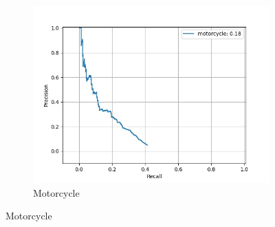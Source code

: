 \begin{figure}[ht]
\begin{subfigure}[t]{0.325\textwidth}
    		\centering
    		\includegraphics[width=\textwidth]{images/sub_ens_pr/class_motorcycle_pr.jpg}
    		\caption{Motorcycle}
    	\end{subfigure}
    	
    
   

\end{figure}

